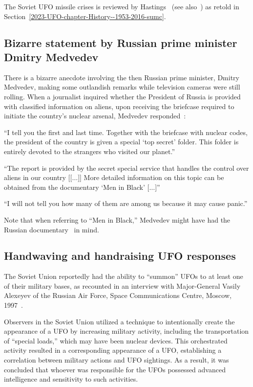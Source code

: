 The Soviet UFO missile crises
is reviewed by Hastings~\cite[Chapter~23]{Hastings2008Jan} (see also~\cite{ABC-transcript-1994,Huneeus2011Jan,Hvar2012})
as retold in Section~\ref{2023-UFO-chapter-History--1953-2016-sumc}.


\subsection{Bizarre statement by Russian prime minister Dmitry Medvedev}

There is a bizarre anecdote involving the then Russian prime minister, Dmitry Medvedev, making some outlandish remarks while television cameras were still rolling. When a journalist inquired whether the President of Russia is provided with classified information on aliens, upon receiving the briefcase required to initiate the country's nuclear arsenal, Medvedev responded~\cite{Sky2012Dec}:
\begin{svgraybox}
``I tell you the first and last time.
Together with the briefcase with nuclear codes, the president of the country is given a special `top secret' folder.
This folder is entirely devoted to the strangers who visited our planet.''

``The report is provided by the secret special service that handles the control over aliens in our country [[$\ldots$]]
More detailed information on this topic can be obtained from the documentary `Men in Black' [$\ldots$]''

``I will not tell you how many of them are among us because it may cause panic.''
\end{svgraybox}
Note that when referring to ``Men in Black,'' Medvedev might have had the Russian documentary~\cite{Ufodisclosure20162013Feb} in mind.

\subsection{Handwaving and handraising UFO responses}

The Soviet Union reportedly had the ability to ``summon'' UFOs to at least one of their military bases, as recounted in an interview with Major-General Vasily Alexeyev of the Russian Air Force, Space Communications Centre, Moscow, 1997~\cite{Hesemann2000,Uvarov_2000}.

Observers in the Soviet Union utilized a technique to intentionally create the appearance of a UFO by increasing military activity, including the transportation of ``special loads,'' which may have been nuclear devices. This orchestrated activity resulted in a corresponding appearance of a UFO, establishing a correlation between military actions and UFO sightings. As a result, it was concluded that whoever was responsible for the UFOs possessed advanced intelligence and sensitivity to such activities.

